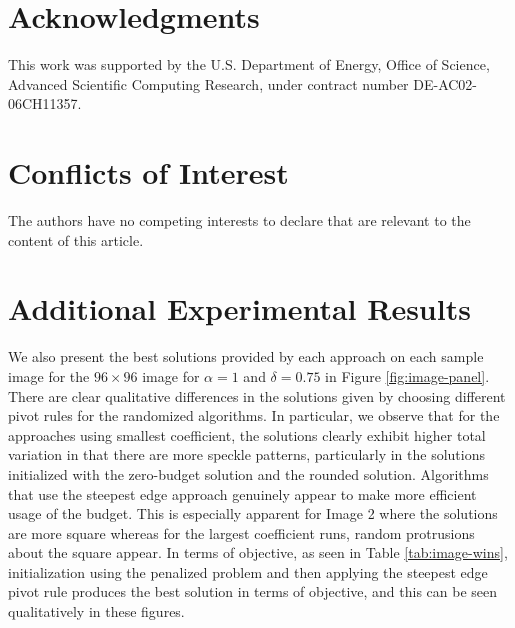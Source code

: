 \documentclass[pdflatex,sn-mathphys-num]{sn-jnl}%
\begin{document}
\section*{Acknowledgments}
This work was supported by the U.S. Department of Energy, Office of Science, Advanced Scientific Computing Research, under contract number DE-AC02-06CH11357.

\section*{Conflicts of Interest}
The authors have no competing interests to declare that are relevant to the content of this article.


\vfill
\begin{flushright}
\scriptsize
{}
\normalsize
\end{flushright}

\pagebreak


\appendix


\section{Additional Experimental Results}

We also present the best solutions provided by each approach on each sample image for the $96\times 96$ image for $\alpha = 1$ and $\delta = 0.75$ in Figure \ref{fig:image-panel}. There are clear qualitative differences in the solutions given by choosing different pivot rules for the randomized algorithms. In particular, we observe that for the approaches using smallest coefficient, the solutions clearly exhibit higher total variation in that there are more speckle patterns, particularly in the solutions initialized with the zero-budget solution and the rounded solution. Algorithms that use the steepest edge approach genuinely appear to make more efficient usage of the budget. This is especially apparent for Image 2 where the solutions are more square whereas for the largest coefficient runs, random protrusions about the square appear. In terms of objective, as seen in Table \ref{tab:image-wins}, initialization using the penalized problem and then applying the steepest edge pivot rule produces the best solution in terms of objective, and this can be seen qualitatively in these figures.
\end{document}
